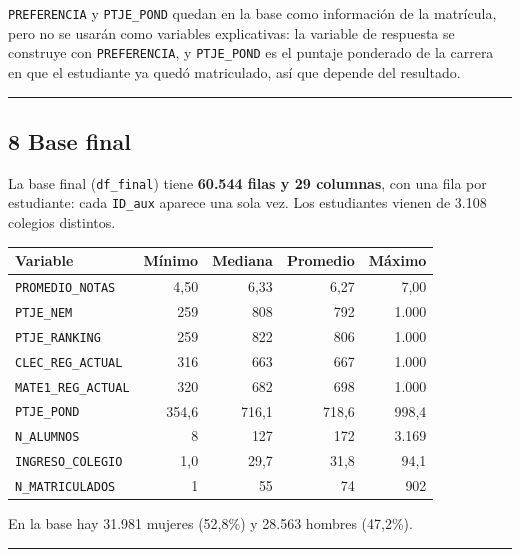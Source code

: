 \documentclass[11pt]{article}
\begin{document}
\texttt{PREFERENCIA} y \texttt{PTJE\_POND} quedan en la base como
información de la matrícula, pero no se usarán como variables
explicativas: la variable de respuesta se construye con
\texttt{PREFERENCIA}, y \texttt{PTJE\_POND} es el puntaje ponderado de
la carrera en que el estudiante ya quedó matriculado, así que depende
del resultado.

\medskip\hrule\medskip

\subsection*{8 \; Base final}

La base final (\texttt{df\_final}) tiene \textbf{60.544 filas y 29
columnas}, con una fila por estudiante: cada \texttt{ID\_aux} aparece una
sola vez. Los estudiantes vienen de 3.108 colegios distintos.

\begin{center}
\begin{tabular}{lrrrr}
\toprule
\textbf{Variable} & \textbf{Mínimo} & \textbf{Mediana} & \textbf{Promedio} & \textbf{Máximo} \\
\midrule
\texttt{PROMEDIO\_NOTAS}   & 4,50  & 6,33  & 6,27  & 7,00 \\
\texttt{PTJE\_NEM}         & 259   & 808   & 792   & 1.000 \\
\texttt{PTJE\_RANKING}     & 259   & 822   & 806   & 1.000 \\
\texttt{CLEC\_REG\_ACTUAL} & 316   & 663   & 667   & 1.000 \\
\texttt{MATE1\_REG\_ACTUAL}& 320   & 682   & 698   & 1.000 \\
\texttt{PTJE\_POND}        & 354,6 & 716,1 & 718,6 & 998,4 \\
\texttt{N\_ALUMNOS}        & 8     & 127   & 172   & 3.169 \\
\texttt{INGRESO\_COLEGIO}  & 1,0   & 29,7  & 31,8  & 94,1 \\
\texttt{N\_MATRICULADOS}   & 1     & 55    & 74    & 902 \\
\bottomrule
\end{tabular}
\end{center}

En la base hay 31.981 mujeres (52,8\%) y 28.563 hombres (47,2\%).

\medskip\hrule\medskip

\end{document}
